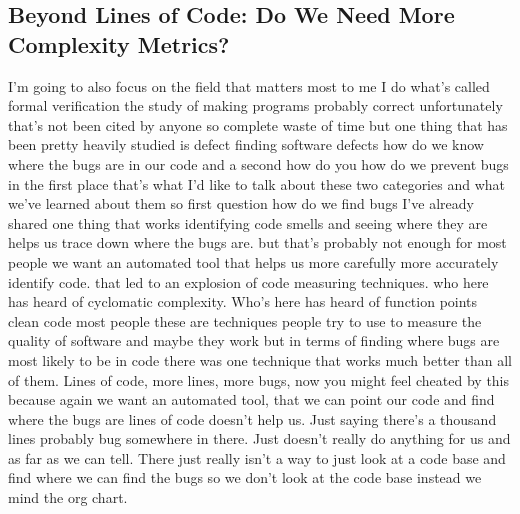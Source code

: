 \documentclass[conference, compsoc, twoside]{IEEEtran}
\begin{document}
\subsection{Beyond Lines of Code: Do We Need More Complexity Metrics?}
I'm going to also focus on the field that matters
most to me I do what's called formal verification the study of making
programs probably correct unfortunately
that's not been cited by anyone so
complete waste of time but one thing
that has been pretty heavily studied is
defect finding software defects how do
we know where the bugs are in our code
and a second how do you how do we
prevent bugs in the first place
that's what I'd like to talk about these two categories and what we've learned
about them so first question how do we
find bugs I've already shared one thing
that works identifying code smells and
seeing where they are helps us trace down where the bugs are. but that's probably not enough for most people we want an automated tool that helps us more carefully more accurately identify code. that led to an explosion of code measuring techniques.
who here has heard of cyclomatic complexity.
Who's here has heard of function points clean code most
people these are techniques people try
to use to measure the quality of
software and maybe they work but in
terms of finding where bugs are most
likely to be in code there was one
technique that works much better than all of them. Lines of code, more lines, more bugs, now you might feel cheated by this because again we want an automated tool, that we can point our code and find where the bugs are lines of code doesn't help us. Just saying there's a thousand lines probably bug somewhere in there.
Just doesn't really do anything for us and as far as we can tell.
There just really isn't a way to just look at a code base and find where we can find the bugs so we don't look at the code base instead we mind the org chart. 
\end{document}
